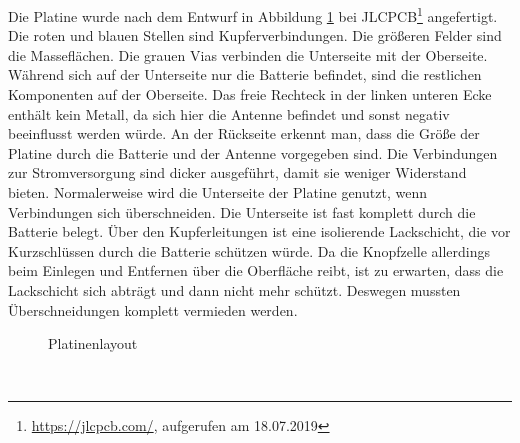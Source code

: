 Die Platine wurde nach dem Entwurf in Abbildung \ref{fig:platinenlayout} bei JLCPCB\footnote{\url{https://jlcpcb.com/}, aufgerufen am 18.07.2019} angefertigt.
Die roten und blauen Stellen sind Kupferverbindungen.
Die größeren Felder sind die Masseflächen.
Die grauen Vias verbinden die Unterseite mit der Oberseite.
Während sich auf der Unterseite nur die Batterie befindet, sind die restlichen Komponenten auf der Oberseite.
Das freie Rechteck in der linken unteren Ecke enthält kein Metall, da sich hier die Antenne befindet und sonst negativ beeinflusst werden würde.
An der Rückseite erkennt man, dass die Größe der Platine durch die Batterie und der Antenne vorgegeben sind.
Die Verbindungen zur Stromversorgung sind dicker ausgeführt, damit sie weniger Widerstand bieten.
Normalerweise wird die Unterseite der Platine genutzt, wenn Verbindungen sich überschneiden.
Die Unterseite ist fast komplett durch die Batterie belegt.
Über den Kupferleitungen ist eine isolierende Lackschicht, die vor Kurzschlüssen durch die Batterie schützen würde.
Da die Knopfzelle allerdings beim Einlegen und Entfernen über die Oberfläche reibt, ist zu erwarten, dass die Lackschicht sich abträgt und dann nicht mehr schützt.
Deswegen mussten Überschneidungen komplett vermieden werden.
\begin{figure}[hbt]
	\centering
	\caption{Platinenlayout}
	\label{fig:platinenlayout}
\end{figure}\\
